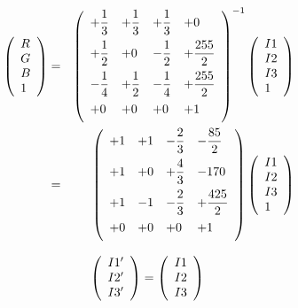 \documentclass{article}
\begin{document}
\begin{eqnarray*} \left( \begin{array}{l} R \\ G \\ B \\ 1 \\ \end{array} \right) &=& \left( \begin{array}{llll} +\dfrac{1}{3} & +\dfrac{1}{3} & +\dfrac{1}{3} & +0 \vspace{.5em} \\ +\dfrac{1}{2} & +0 & -\dfrac{1}{2} & +\dfrac{255}{2} \vspace{.5em} \\ -\dfrac{1}{4} & +\dfrac{1}{2} & -\dfrac{1}{4} & +\dfrac{255}{2} \vspace{.5em} \\ +0 & +0 & +0 & +1 \vspace{.5em} \\ \end{array} \right)^{-1} \left( \begin{array}{l} I1 \\ I2 \\ I3 \\ 1 \\ \end{array} \right) \\ &=& \left( \begin{array}{llll} +1 & +1 & -\dfrac{2}{3} & -\dfrac{85}{2} \vspace{.5em} \\ +1 & +0 & +\dfrac{4}{3} & -170 \vspace{.5em} \\ +1 & -1 & -\dfrac{2}{3} & +\dfrac{425}{2} \vspace{.5em} \\ +0 & +0 & +0 & +1 \vspace{.5em} \\ \end{array} \right) \left( \begin{array}{l} I1 \\ I2 \\ I3 \\ 1 \\ \end{array} \right) \end{eqnarray*}
\pagebreak

\[ \left( \begin{array}{l} I1' \\ I2' \\ I3' \\ \end{array} \right) = \left( \begin{array}{l} I1 \\ I2 \\ I3 \\ \end{array} \right) \\ \]
\pagebreak
\end{document}
